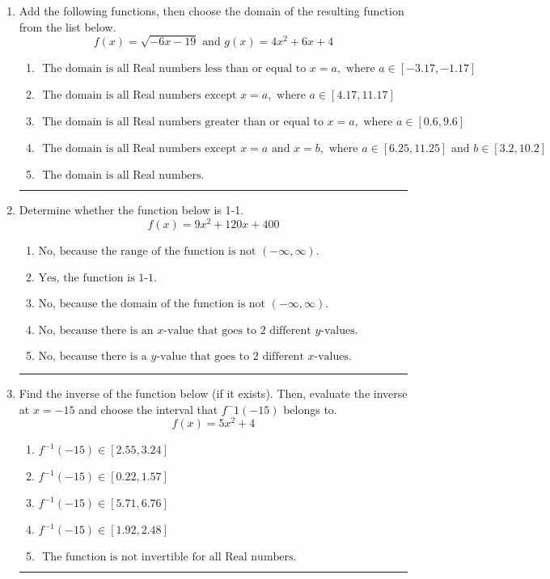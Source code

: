 \documentclass[14pt]{extbook}
\newcommand{\litem}[1]{\item#1\hspace*{-1cm}\rule{\textwidth}{0.4pt}}
\begin{document}
\begin{enumerate}
{\begin{enumerate}[label=\Alph*.]
\end{enumerate} }
\litem{
Add the following functions, then choose the domain of the resulting function from the list below.\[ f(x) = \sqrt{-6x-19}  \text{ and } g(x) = 4x^{2} +6 x + 4 \]\begin{enumerate}[label=\Alph*.]
\item \( \text{ The domain is all Real numbers less than or equal to } x = a, \text{ where } a \in [-3.17, -1.17] \)
\item \( \text{ The domain is all Real numbers except } x = a, \text{ where } a \in [4.17, 11.17] \)
\item \( \text{ The domain is all Real numbers greater than or equal to } x = a, \text{ where } a \in [0.6, 9.6] \)
\item \( \text{ The domain is all Real numbers except } x = a \text{ and } x = b, \text{ where } a \in [6.25, 11.25] \text{ and } b \in [3.2, 10.2] \)
\item \( \text{ The domain is all Real numbers. } \)

\end{enumerate} }
\litem{
Determine whether the function below is 1-1.\[ f(x) = 9 x^2 + 120 x + 400 \]\begin{enumerate}[label=\Alph*.]
\item \( \text{No, because the range of the function is not $(-\infty, \infty)$.} \)
\item \( \text{Yes, the function is 1-1.} \)
\item \( \text{No, because the domain of the function is not $(-\infty, \infty)$.} \)
\item \( \text{No, because there is an $x$-value that goes to 2 different $y$-values.} \)
\item \( \text{No, because there is a $y$-value that goes to 2 different $x$-values.} \)

\end{enumerate} }
\litem{
Find the inverse of the function below (if it exists). Then, evaluate the inverse at $x = -15$ and choose the interval that $f^-1(-15)$ belongs to.\[ f(x) = 5 x^2 + 4 \]\begin{enumerate}[label=\Alph*.]
\item \( f^{-1}(-15) \in [2.55, 3.24] \)
\item \( f^{-1}(-15) \in [0.22, 1.57] \)
\item \( f^{-1}(-15) \in [5.71, 6.76] \)
\item \( f^{-1}(-15) \in [1.92, 2.48] \)
\item \( \text{ The function is not invertible for all Real numbers. } \)


\end{enumerate}}
\end{enumerate}
\end{document}
